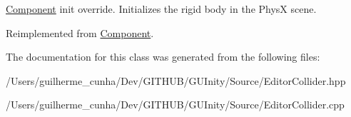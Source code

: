 \hyperlink{class_component}{Component} init override. Initializes the rigid body in the Phys\+X scene. 

Reimplemented from \hyperlink{class_component_a72d67b02e6733c1a6fb73cbaaf8ebff4}{Component}.



The documentation for this class was generated from the following files\+:\begin{DoxyCompactItemize}
\item 
/\+Users/guilherme\+\_\+cunha/\+Dev/\+G\+I\+T\+H\+U\+B/\+G\+U\+Inity/\+Source/Editor\+Collider.\+hpp\item 
/\+Users/guilherme\+\_\+cunha/\+Dev/\+G\+I\+T\+H\+U\+B/\+G\+U\+Inity/\+Source/Editor\+Collider.\+cpp\end{DoxyCompactItemize}
